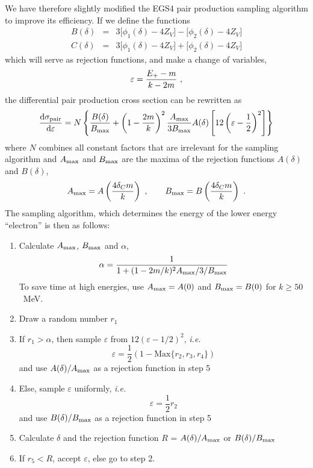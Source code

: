We have therefore slightly modified the EGS4 pair production sampling algorithm to improve 
its efficiency. If we define the functions 
\begin{eqnarray}
B(\delta) & = & 3 \Big[ \phi_1(\delta) - 4 Z_V \Big] - 
\Big[ \phi_2(\delta) - 4 Z_V \Big] \nonumber \\
C(\delta) & = & 3 \Big[ \phi_1(\delta) - 4 Z_V \Big] + 
\Big[ \phi_2(\delta) - 4 Z_V \Big] 
\end{eqnarray}
which will serve as rejection functions, and make 
a change of variables, 
\begin{equation}
\varepsilon  = {E_+ - m \over k - 2 m}~,
\end{equation}
the differential pair production cross section can be 
rewritten as 
\begin{equation}
{{\rm d} \sigma_{\rm pair} \over {\rm d} \varepsilon} = 
N \left\{ {B(\delta) \over B_{\rm max}} + \left(1 - {2 m \over k} \right)^2 
{A_{\rm max} \over 3 B_{\rm max}} A(\delta) 
\left[ 12 \left(\varepsilon - \frac{1}{2} \right)^2 \right] \right\}
\end{equation}
where $N$ combines all constant factors that are irrelevant for 
the sampling algorithm and $A_{\rm max}$ and $B_{\rm max}$ are 
the maxima of the rejection functions $A(\delta)$ and $B(\delta)$, 
\begin{equation}
A_{\rm max} = A\left({4 \delta_C m \over k}\right)~, \quad \quad 
B_{\rm max} = B\left({4 \delta_C m \over k}\right)~.
\end{equation}
The sampling algorithm, which determines the energy 
of the lower energy ``electron'' is then as follows:
\begin{enumerate}
\item
Calculate $A_{\rm max}$, $B_{\rm max}$ and $\alpha$,
\begin{equation}
\alpha = {1 \over 1 + (1 - 2 m/k)^2 A_{\rm max}/3/B_{\rm max}}
\end{equation}
To save time at high energies, use $A_{\rm max} = A(0)$ and 
$B_{\rm max} = B(0)$ for $k \ge 50$~MeV.
\item
Draw a random number $r_1$
\item
If $r_1 > \alpha$, then sample $\varepsilon$ 
from $12 (\varepsilon - 1/2 )^2$, {\em i.e.}
\begin{equation}
\varepsilon = \frac{1}{2} \left(1 - \mbox{Max}\{r_2,r_3,r_4\}\right)
\end{equation}
and use $A(\delta)/A_{\rm max}$ as a rejection function in step 5
\item
Else, sample $\varepsilon$ uniformly, {\em i.e.}
\begin{equation}
\varepsilon = \frac{1}{2} r_2
\end{equation}
and use $B(\delta)/B_{\rm max}$ as a rejection function in step 5
\item
Calculate $\delta$ and the rejection function $R$ = $A(\delta)/A_{\rm max}$ or 
$B(\delta)/B_{\rm max}$ 
\item
If $r_5 < R$, accept $\varepsilon$, else go to step 2.
\end{enumerate}

